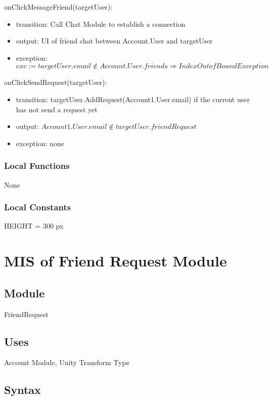 \documentclass[12pt, titlepage]{article}
\begin{document}
\noindent onClickMessageFriend(targetUser):
\begin{itemize}
\item transition: Call Chat Module to establish a connection
\item output: UI of friend chat between Account.User and targetUser
\item exception: $exc := targetUser.email \notin Account.User.friends \Rightarrow IndexOutofBound Exception$
\end{itemize}

\noindent onClickSendRequest(targetUser):
\begin{itemize}
\item transition: targetUser.AddRequest(Account1.User.email) if the current user has not send a request yet
\item output: $Account1.User.email \notin targetUser.friendRequest$
\item exception: none
\end{itemize}

\subsubsection{Local Functions}

None

\subsubsection{Local Constants}
HEIGHT = 300 px

\newpage

\section{MIS of Friend Request Module} \label{mFR}

\subsection{Module}

FriendRequest

\subsection{Uses}

Account Module, Unity Transform Type

\subsection{Syntax}
\end{document}
